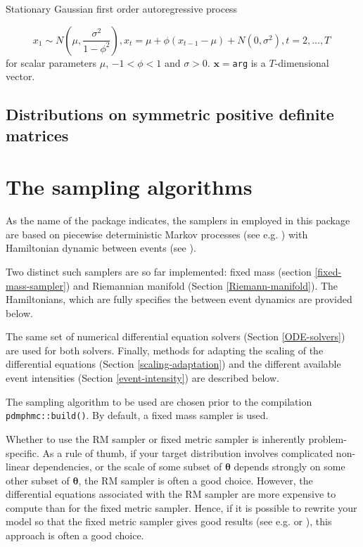 \documentclass[
]{book}
\begin{document}
Stationary Gaussian first order autoregressive process

\[
x_1 \sim N\left (\mu,\frac{\sigma^2}{1-\phi^2} \right), x_{t} = \mu + \phi ( x_{t-1}-\mu) + N(0,\sigma^2),t=2,\dots,T\;
\]
for scalar parameters \(\mu\), \(-1<\phi<1\) and \(\sigma>0\). \(\mathbf x=\)\texttt{arg} is a \(T\)-dimensional vector.

\hypertarget{distributions-on-symmetric-positive-definite-matrices}{%
\section{Distributions on symmetric positive definite matrices}\label{distributions-on-symmetric-positive-definite-matrices}}

\hypertarget{the-samplers}{%
\chapter{The sampling algorithms}\label{the-samplers}}

As the name of the package indicates, the samplers in employed in this package are based on piecewise deterministic Markov processes (see e.g. \citet{fearnhead2018}) with Hamiltonian dynamic between events (see \citet{kleppe_CTHMC}).

Two distinct such samplers are so far implemented: fixed mass (section \ref{fixed-mass-sampler}) and Riemannian manifold (Section \ref{Riemann-manifold}). The Hamiltonians, which are fully specifies the between event dynamics are provided below.

The same set of numerical differential equation solvers (Section \ref{ODE-solvers}) are used for both solvers. Finally, methods for adapting the scaling of the differential equations (Section \ref{scaling-adaptation}) and the different available event intensities (Section \ref{event-intensity}) are described below.

The sampling algorithm to be used are chosen prior to the compilation \texttt{pdmphmc::build()}. By default, a fixed mass sampler is used.

Whether to use the RM sampler or fixed metric sampler is inherently problem-specific. As a rule of thumb, if your target distribution involves complicated non-linear dependencies, or the scale of some subset of \(\boldsymbol \theta\) depends strongly on some other subset of \(\boldsymbol \theta\), the RM sampler is often a good choice. However, the differential equations associated with the RM sampler are more expensive to compute than for the fixed metric sampler. Hence, if it is possible to rewrite your model so that the fixed metric sampler gives good results (see e.g. \citet{doi:10.1080/10618600.2019.1584901} or \citet{1812.07929}), this approach is often a good choice.
\end{document}
